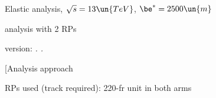 


\def\baseDir{/afs/cern.ch/work/j/jkaspar/analyses/elastic/6500GeV/beta2500/2rp/}

\def\section{\IfNch[{\sectionRef}{\sectionBase}}
\def\sectionRef[#1]#2{\sectionBase{#2}\MakeRef{s:#1}{\the\nsec}\pdfdest name {s:#1} xyz}
\def\sectionBase#1{%
	\advance\nsec1
	\nsubsec=0 
	\nssubsec=0%
	\penalty-\clubpenalty
	\vskip2\baselineskip
	{%
		\baselineskip15pt
		\vbox{%
			\noindent\SetFontSizesXII\bf\the\nsec. #1%
		}%
	}%
	\penalty\clubpenalty
	\vskip0\baselineskip
	\parindent=0pt
	\everypar={\parindent=\ParIndent \everypar={}}%
}

\def\subsection{\IfNch[{\subsectionRef}{\subsectionBase}}
\def\subsectionRef[#1]#2{\subsectionBase{#2}\MakeRef{s:#1}{\the\nsec.\the\nsubsec}\pdfdest name {s:#1} xyz}
\def\subsectionBase#1{%
	\advance\nsubsec1
	\nssubsec=0%
	\penalty-\clubpenalty
	\vskip2\baselineskip
	{%
		\vbox{%
			\noindent\bf\the\nsec.\the\nsubsec. #1%
		}%
	}%
	\penalty\clubpenalty
	\vskip0\baselineskip
	\parindent=0pt
	\everypar={\parindent=\ParIndent \everypar={}}%
}

\def\sref#1{%
	\pdfstartlink goto name {s:#1}%
	\linkColor%
	\safecom{s:#1}%
	\cBlack%
	\pdfendlink
}

\def\linkColor{\cBlue}



\centerline{\SetFontSizesXX Elastic analysis, $\sqrt s = 13\un{TeV}$, $\be^* = 2500\un{m}$}
\vskip2mm
\centerline{\SetFontSizesXX analysis with 2 RPs }
\vskip2mm
\centerline{version: {\it \number\day. \number\month. \number\year}}

\section{Analysis approach}

\> RPs used (track required): 220-fr unit in both arms



